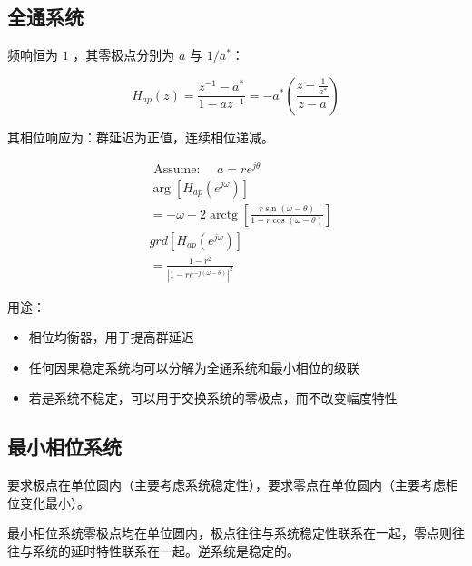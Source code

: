 \documentclass[cn,11pt,chinese,black,simple]{elegantbook}
\begin{document}
\subsection{全通系统}

频响恒为 \(1\) ，其零极点分别为 \(a\) 与 \(1/a^*\)： 

\[
H_{a p}(z)=\frac{z^{-1}-a^{*}}{1-a z^{-1}}=-a^{*}\left(\frac{z-\frac{1}{a^{*}}}{z-a}\right)
\]

其相位响应为：群延迟为正值，连续相位递减。


\[
\begin{aligned}
&\text { Assume: } \quad a=r e^{j \theta}\\
&\arg \left[H_{a p}\left(e^{j \omega}\right)\right]\\
&=-\omega-2 \operatorname{arctg}\left[\frac{r \sin (\omega-\theta)}{1-r \cos (\omega-\theta)}\right]\\
&g r d\left[H_{a p}\left(e^{j \omega}\right)\right]\\
&=\frac{1-r^{2}}{\left|1-r e^{-j(\omega-\theta)}\right|^{2}}
\end{aligned}
\]

用途：

\begin{itemize}
    \item 相位均衡器，用于提高群延迟
    \item 任何因果稳定系统均可以分解为全通系统和最小相位的级联
    \item 若是系统不稳定，可以用于交换系统的零极点，而不改变幅度特性
\end{itemize}


\subsection{最小相位系统}

要求极点在单位圆内（主要考虑系统稳定性），要求零点在单位圆内（主要考虑相位变化最小）。

最小相位系统零极点均在单位圆内，极点往往与系统稳定性联系在一起，零点则往往与系统的延时特性联系在一起。逆系统是稳定的。
\end{document}
